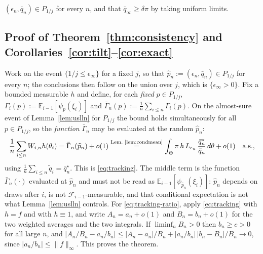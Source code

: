 \documentclass[10pt]{article}
\theoremstyle{plain}
\theoremstyle{definition}
\begin{document}
$(\epsilon_n,\bar q_n)\in P_{1/j}$ for every $n$, and that $\bar q_\infty\ge\delta\pi$ by taking uniform limits.

\subsection{Proof of Theorem~\ref{thm:consistency} and Corollaries~\ref{cor:tilt}--\ref{cor:exact}}\label{app:theory-consistency}
Work on the event $\{1/j\le\epsilon_\infty\}$ for a fixed $j$, so that $\widehat p_n:=(\epsilon_n,\bar q_n)\in P_{1/j}$ for every $n$; the conclusions then follow on the union over $j$, which is $\{\epsilon_\infty>0\}$. Fix a bounded measurable $h$ and define, for each \emph{fixed} $p\in P_{1/j}$, $\Gamma_i(p):=\mathbb{E}_{i-1}[\psi_p(\xi_i)]$ and $\bar\Gamma_n(p):=\tfrac1n\sum_{i\le n}\Gamma_i(p)$. On the almost-sure event of Lemma~\ref{lem:uslln} for $P_{1/j}$ the bound holds simultaneously for all $p\in P_{1/j}$, so the \emph{function} $\bar\Gamma_n$ may be evaluated at the random $\widehat p_n$:
\begin{equation}
\frac1n\sum_{i\le n}W_{i,n}h(\theta_i)
=\bar\Gamma_n(\widehat p_n)+o(1)
\overset{\text{Lem.\ \ref{lem:condmean}}}{=}\int_\Theta \pi\,h\,L_{\epsilon_n}\,\frac{\bar q^\star_n}{\bar q_n}\,d\theta+o(1)
\quad\text{a.s.},
\label{eq:app-consistency-main}
\end{equation}
using $\tfrac1n\sum_{i\le n}\tilde q_i=\bar q^\star_n$. This is \eqref{eq:tracking}. The middle term is the function $\bar\Gamma_n(\cdot)$ evaluated at $\widehat p_n$ and must not be read as $\mathbb{E}_{i-1}[\psi_{\widehat p_n}(\xi_i)]$: $\widehat p_n$ depends on draws after $i$, is not $\mathcal{F}_{i-1}$-measurable, and that conditional expectation is not what Lemma~\ref{lem:uslln} controls. For \eqref{eq:tracking-ratio}, apply \eqref{eq:tracking} with $h=f$ and with $h\equiv1$, and write $A_n=a_n+o(1)$ and $B_n=b_n+o(1)$ for the two weighted averages and the two integrals. If $\liminf_nB_n>0$ then $b_n\ge c>0$ for all large $n$, and $|A_n/B_n-a_n/b_n|\le|A_n-a_n|/B_n+|a_n/b_n|\,|b_n-B_n|/B_n\to0$, since $|a_n/b_n|\le\|f\|_\infty$. This proves the theorem.
\end{document}
